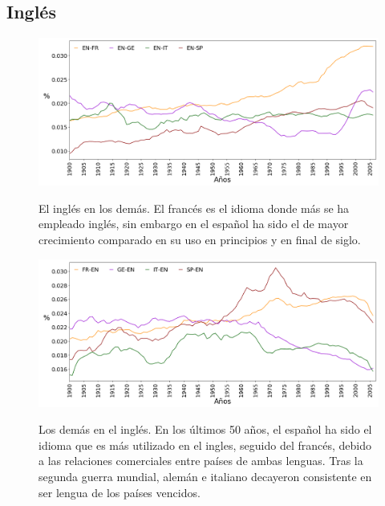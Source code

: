 \clearpage
\subsection{Inglés}


\begin{figure}[h!]
	\centering
	\includegraphics[scale=.36]{Cap_4/PF1_S2_EN.png}
	\label{fig.ST_a_EN}
	\caption{El inglés en los demás. El francés es el idioma donde más se ha empleado inglés, sin embargo en el español ha sido el de mayor crecimiento comparado en su uso en principios y en final de siglo.}
\end{figure} 



\begin{figure}[h!]
	\centering
	\includegraphics[scale=.36]{Cap_4/PF2_S2_EN.png}
	\label{fig.ST_b_EN}
	\caption{Los demás en el inglés. En los últimos 50 años, el español ha sido el idioma que es más utilizado en el ingles, seguido del francés, debido a las relaciones comerciales entre países de ambas lenguas.  Tras la segunda guerra mundial, alemán e italiano decayeron consistente en ser lengua de los países vencidos. }
\end{figure} 


\clearpage

